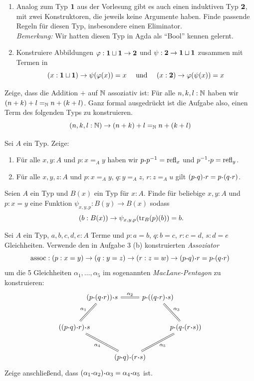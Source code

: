 \documentclass{hott-übung}
\begin{document}
\setcounter{blattnummer}{2}
\setcounter{aufgabennummer}{0}

\blatt

\aufgabe{}
\begin{enumerate}
\item Analog zum Typ $\mathbf{1}$ aus der Vorlesung gibt es auch einen induktiven Typ $\mathbf{2}$, mit zwei Konstruktoren, die jeweils keine Argumente haben.
Finde passende Regeln für diesen Typ, insbesondere einen Eliminator.\\
\emph{Bemerkung:} Wir hatten diesen Typ in Agda als ``Bool'' kennen gelernt. 
\item Konstruiere Abbildungen $\varphi:\mathbf{1}\sqcup \mathbf{1}\to \mathbf{2}$ und $\psi:\mathbf{2}\to \mathbf{1}\sqcup \mathbf{1}$
zusammen mit Termen in
\[
  (x:\mathbf{1}\sqcup \mathbf{1})\to \psi (\varphi(x))=x\quad \text{ und }\quad (x:\mathbf{2})\to \varphi(\psi(x))=x
\]
\end{enumerate}

\aufgabe{}
Zeige, dass die Addition $+$ auf $\mathbb{N}$ assoziativ ist:
Für alle $n,k,l:\mathbb{N}$ haben wir $(n+k)+l=_{\mathbb{N}} n+(k+l)$.
Ganz formal ausgedrückt ist die Aufgabe also, einen Term des folgenden Typs zu konstruieren.
\[
  (n,k,l:\mathbb{N}) \to (n+k)+l=_{\mathbb{N}} n+(k+l)
\]

\aufgabe{}
Sei $A$ ein Typ. Zeige:
\begin{enumerate}
\item Für alle $x,y : A$ und $ p:x=_A y$ haben wir $ p\kon p^{-1}=\refl_x$ und $p^{-1}\kon p=\refl_y$.
\item Für alle $x,y,z : A$ und $ p:x=_Ay$, $ q:y=_Az$, $ r:z=_Au$ gilt
   $( p\kon q)\kon r= p\kon( q\kon r)$.
\end{enumerate}

\aufgabe{}
Seien $A$ ein Typ und $B(x)$ ein Typ für $x:A$.
Finde für beliebige $x,y:A$ und $p:x=y$ eine Funktion $\psi_{x,y,p}:B(y)\to B(x)$
sodass 
\[
  (b:B(x))\to \psi_{x,y,p} (\transp_B(p)(b))=b\rlap{.}
\]

\bonus{}
  Sei \(A\) ein Typ, $a,b,c,d,e:A$ Terme und $p:a=b$, $q:b=c$, $r:c=d$, $s:d=e$ Gleichheiten.
  Verwende den in Aufgabe 3 (b) konstruierten \emph{Assoziator}
  \[\ass:(p:x=y)\to (q:y=z)\to (r:z=w) \to (p\kon q)\kon r = p \kon (q\kon r)\]
  um die 5 Gleichheiten $\alpha_1,\dots,\alpha_5$ im sogenannten \emph{MacLane-Pentagon} zu konstruieren:
  \begin{equation*}
    \begin{tikzcd}[column sep={between origins,1.4cm},row sep={between origins,1.5cm}]
      & (p \kon (q \kon r)) \kon s
      \arrow[rr,equal,"\alpha_2"]
      && p \kon ((q \kon r) \kon s)
      \arrow[dr,equal,"\alpha_3"]
      &
      \\
      ((p \kon q) \kon r) \kon s
      \arrow[ur,equal,"\alpha_1"]
      \arrow[drr,equal,"\alpha_4"']
      &&&& p \kon (q \kon (r \kon s))
      \\
      && (p \kon q) \kon (r \kon s)
      \arrow[urr,equal,"\alpha_5"']
      &&
    \end{tikzcd}
  \end{equation*}
  Zeige anschließend, dass $(\alpha_1\kon\alpha_2)\kon\alpha_3 = \alpha_4\kon\alpha_5$ ist.
\end{document}
